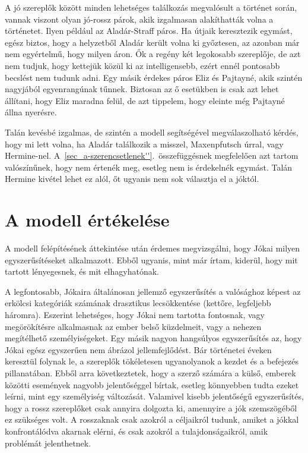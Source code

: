 \documentclass{thesis-ekf}
\begin{document}
    A jó szereplők között minden lehetséges találkozás megvalósult a történet során, vannak viszont olyan jó‑rossz párok,
        akik izgalmasan alakíthatták volna a történetet.
    Ilyen például az Aladár-Straff páros.
    Ha útjaik keresztezik egymást, egész biztos, hogy a helyzetből Aladár került volna ki győztesen,
        az azonban már nem egyértelmű, hogy milyen áron.
    Ők a regény két legokosabb szereplője, de azt nem tudjuk, hogy kettejük közül ki az intelligensebb,
        ezért ennél pontosabb becslést nem tudunk adni.
    Egy másik érdekes páros Eliz és Pajtayné, akik szintén nagyjából egyenrangúnak tűnnek.
    Biztosan az ő esetükben is csak azt lehet állítani, hogy Eliz maradna felül, de azt tippelem, hogy eleinte még
        Pajtayné állna nyerésre.

    Talán kevésbé izgalmas, de szintén a modell segítségével megválaszolható kérdés, hogy mi lett volna,
        ha Aladár találkozik a misszel, Maxenpfutsch úrral, vagy Hermine-nel.
    A~\ref{sec_a-szerencsetlenek''}.~összefüggésnek megfelelően azt tartom valószínűnek, hogy nem értenék meg,
        esetleg nem is érdekelnék egymást.
    Talán Hermine kivétel lehet ez alól, őt ugyanis nem sok választja el a jóktól.

    \section{A modell értékelése}

    A modell felépítésének áttekintése után érdemes megvizsgálni, hogy Jókai milyen egyszerűsítéseket alkalmazott.
    Ebből ugyanis, mint már írtam, kiderül, hogy mit tartott lényegesnek, és mit elhagyhatónak.

    A legfontosabb, Jókaira általánosan jellemző egyszerűsítés a valósághoz képest az erkölcsi kategóriák számának
        drasztikus lecsökkentése (kettőre, legfeljebb háromra).
    Eszerint lehetséges, hogy Jókai nem tartotta fontosnak, vagy megörökítésre alkalmasnak az ember belső küzdelmeit,
        vagy a nehezen megítélhető személyiségeket.
    Egy másik nagyon hangsúlyos egyszerűsítés az, hogy Jókai egész egyszerűen nem ábrázol jellemfejlődést.
    Bár történetei éveken keresztül folynak le, a szereplők tökéletesen ugyanolyanok a kezdet és a befejezés pillanatában.
    Ebből arra következtetek, hogy a szerző számára a külső, emberek közötti események nagyobb jelentőséggel bírtak,
        esetleg könnyebben tudta ezeket leírni, mint egy személyiség változását.
    Valamivel kisebb jelentőségű egyszerűsítés, hogy a rossz szereplőket csak annyira dolgozta ki,
        amennyire a jók szemszögéből ez szükséges volt.
    A rosszaknak csak azokról a céljaikról tudunk, amiket a jókkal konfrontálódva akarnak elérni, és csak azokról
        a tulajdonságaikról, amik problémát jelenthetnek.
\end{document}
